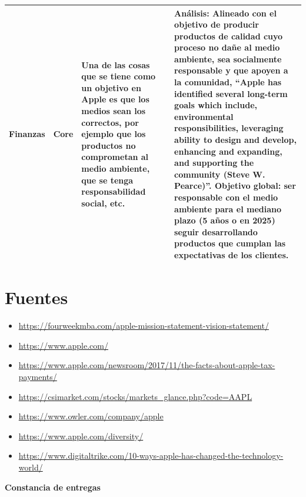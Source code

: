 \documentclass{article}
\begin{document}
\begin{center}
\begin{supertabular}{ |p{2cm}|p{2cm}|p{5.5cm}|p{5.5cm}| }
        \hline
            Finanzas & Core & Una de las cosas que se tiene como un objetivo en Apple es que los medios sean los correctos, por ejemplo que los productos no comprometan al medio ambiente, que se tenga responsabilidad social, etc. & \textbf{Análisis:} Alineado con el objetivo de producir productos de calidad cuyo proceso no dañe al medio ambiente, sea socialmente responsable y que apoyen a la comunidad, ``Apple has identified several long-term goals which include, environmental responsibilities, leveraging ability to design and develop, enhancing and expanding, and supporting the community (Steve W. Pearce)''. \textbf{Objetivo global}: ser responsable con el medio ambiente para el mediano plazo (5 años o en 2025) seguir desarrollando productos que cumplan las expectativas de los clientes. \\ 
        \hline
    \end{supertabular}
\end{center}




\section{Fuentes}
\begin{itemize}
    \item \url{https://fourweekmba.com/apple-mission-statement-vision-statement/}
    \item \url{https://www.apple.com/}
    \item \url{https://www.apple.com/newsroom/2017/11/the-facts-about-apple-tax-payments/}
    \item \url{https://csimarket.com/stocks/markets_glance.php?code=AAPL}
    \item \url{https://www.owler.com/company/apple}
    \item \url{https://www.apple.com/diversity/}
    \item \url{https://www.digitaltrike.com/10-ways-apple-has-changed-the-technology-world/} 
\end{itemize}



\clearpage
\begin{center}
    \thispagestyle{fancy}
    \vspace*{\fill}
    \Huge{\textbf{Constancia de entregas}}
    \vspace*{\fill}
\end{center}
\clearpage
\end{document}
